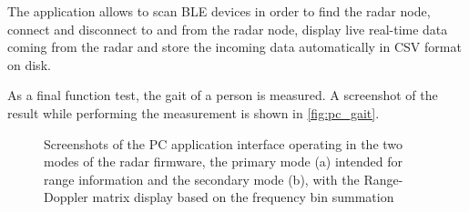 The application allows to scan BLE devices in order to find the radar node, connect and disconnect to and from the radar node, display live real-time data coming from the radar and store the incoming data automatically in CSV format on disk.

As a final function test, the gait of a person is measured. A screenshot of the result while performing the measurement is shown in \cref{fig:pc_gait}.

\begin{figure}[htb]
	\centering
	\caption{Screenshots of the PC application interface operating in the two modes of the radar firmware, the primary mode (a) intended for range information and the secondary mode (b), with the Range-Doppler matrix display based on the frequency bin summation \label{fig:pc}}
\end{figure}

